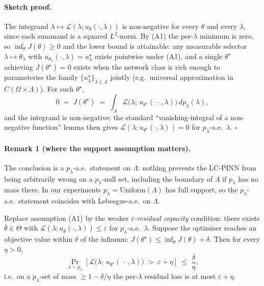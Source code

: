 \paragraph{Sketch proof.}
The integrand
$\lambda \mapsto \mathcal{L}(\lambda; u_\theta(\cdot,\lambda))$ is
non-negative for every $\theta$ and every $\lambda$, since each summand
is a squared $L^2$-norm. By (A1) the per-$\lambda$ minimum is zero, so
$\inf_\theta J(\theta) \ge 0$ and the lower bound is attainable: any
measurable selector $\lambda \mapsto \theta_\lambda$ with
$u_{\theta_\lambda}(\cdot, \lambda) = u^\star_\lambda$ exists pointwise
under (A1), and a single $\theta^\star$ achieving $J(\theta^\star) = 0$
exists when the network class is rich enough to parameterise the family
$\{u^\star_\lambda\}_{\lambda \in \Lambda}$ jointly (e.g.\ universal
approximation in $C(\Omega \times \Lambda)$). For such $\theta^\star$,
\[
   0 \;=\; J(\theta^\star)
   \;=\; \int_{\Lambda}
            \mathcal{L}\bigl(\lambda;\, u_{\theta^\star}(\,\cdot\,, \lambda)\bigr)
         \, dp_\lambda(\lambda) ,
\]
and the integrand is non-negative; the standard
``vanishing-integral of a non-negative function'' lemma then gives
$\mathcal{L}(\lambda; u_{\theta^\star}(\cdot,\lambda)) = 0$ for
$p_\lambda$-a.e.~$\lambda$. \hfill$\square$

\paragraph{Remark 1 (where the support assumption matters).}
The conclusion is a $p_\lambda$-a.e.\ statement on $\Lambda$: nothing
prevents the LC-PINN from being arbitrarily wrong on a
$p_\lambda$-null set, including the boundary of $\Lambda$ if
$p_\lambda$ has no mass there. In our experiments
$p_\lambda = \mathrm{Uniform}(\Lambda)$ has full support, so the
$p_\lambda$-a.e.\ statement coincides with Lebesgue-a.e.\ on
$\Lambda$.

\begin{corollary}
\label{cor:finite-capacity}
Replace assumption \textnormal{(A1)} by the weaker
\emph{$\varepsilon$-residual capacity} condition: there exists
$\bar\theta \in \Theta$ with
$\mathcal{L}(\lambda; u_{\bar\theta}(\cdot,\lambda)) \le \varepsilon$
for $p_\lambda$-a.e.\ $\lambda$. Suppose the optimiser reaches an
objective value within $\delta$ of the infimum:
$J(\theta^\star) \le \inf_\theta J(\theta) + \delta$. Then for every
$\eta > 0$,
\[
   \Pr_{\lambda \sim p_\lambda}\!\left[
      \mathcal{L}\bigl(\lambda;\, u_{\theta^\star}(\,\cdot\,, \lambda)\bigr)
      \;>\; \varepsilon + \eta
   \right]
   \;\le\; \frac{\delta}{\eta} ,
\]
i.e.\ on a $p_\lambda$-set of mass $\ge 1 - \delta/\eta$ the
per-$\lambda$ residual loss is at most $\varepsilon + \eta$.
\end{corollary}

